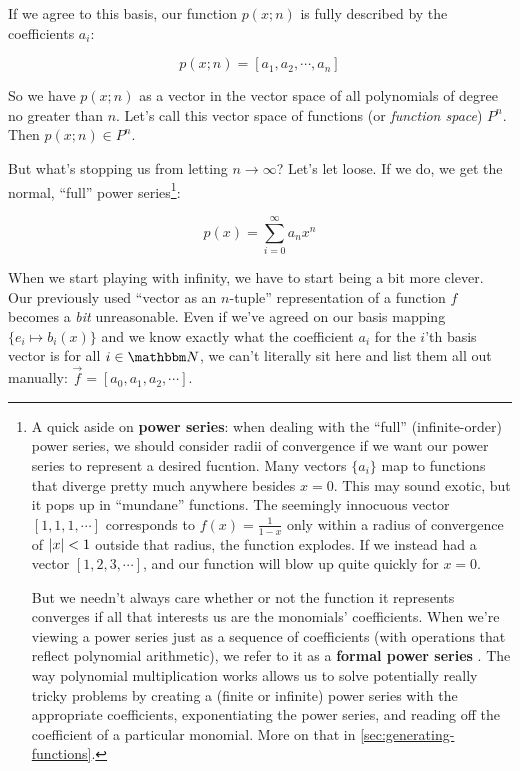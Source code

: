 \documentclass[letterpaper,12pt]{report}
\begin{document}
If we agree to this basis,
our function \(p(x;n)\) is fully described by the coefficients \(a_i\):

\[p(x;n) = \left[a_1, a_2, \cdots, a_n\right]\]

So we have \(p(x;n)\) as a vector
in the vector space of all polynomials
of degree no greater than \(n\).
Let's call this vector space of functions
(or \emph{function space}) \(P^n\).
Then \(p(x;n) \in P^n\).
\par


But what's stopping us from
letting \(n \rightarrow \infty\)?
Let's let loose.
If we do, we get the normal, ``full'' power series\footnote{
A quick aside on \textbf{power series}:
when dealing with the ``full'' (infinite-order) power series,
we should consider radii of convergence if we want our 
power series to represent a desired fucntion.
Many vectors \(\{a_i\}\) map to functions that diverge
pretty much anywhere besides \(x=0\). 
This may sound exotic, but it pops up in ``mundane'' functions.
The seemingly innocuous vector 
\(\left[1, 1, 1, \cdots\right]\) corresponds
to \(f(x) = \frac{1}{1-x}\) only within a radius of
convergence of \(\abs{x} < 1\) 
\textemdash{} outside that radius, the function explodes. If we instead had a vector
\(\left[1, 2, 3, \cdots \right]\), and our function will
blow up quite quickly for \(x=0\).\par

But we needn't always care whether or not the function it
represents converges if all that interests us 
are the monomials' coefficients. 
When we're viewing a power series just as a sequence of
coefficients 
(with operations that reflect
polynomial arithmetic), we refer to it as a
\textbf{formal power series}
.
The way polynomial multiplication works allows us to
solve potentially really tricky problems by creating a
(finite or infinite) power series with the appropriate
coefficients, exponentiating the power series,
and reading off the coefficient of a particular monomial.
More on that in \ref{sec:generating-functions}.
}:

\[p(x) = \sum_{i=0}^{\infty}a_n x^n\]


When we start playing with infinity, we have to start
being a bit more clever.
Our previously used ``vector as an \(n\)-tuple''
representation of a function \(f\) becomes a \emph{bit}
unreasonable. Even if we've agreed on our basis mapping
\(\{e_i \mapsto b_i(x)\}\)
and we know exactly what the coefficient \(a_i\)
for the \(i\)'th basis vector is for all \(i \in \domain{N}\),
we can't literally sit here and list them all out manually:
\(\vec{f} = \left[a_0, a_1, a_2, \cdots \right]\). \par
\end{document}
